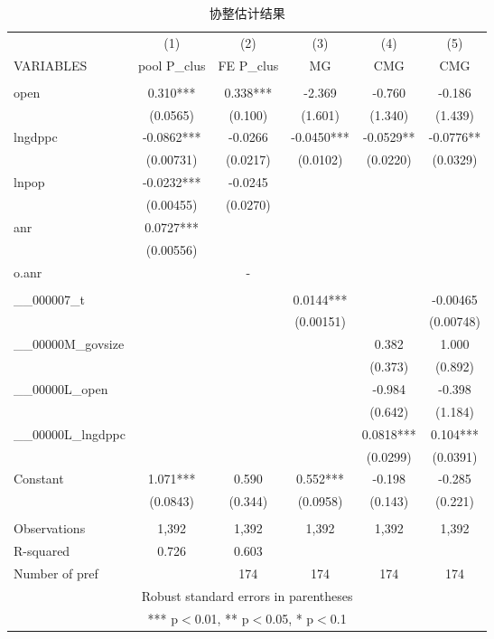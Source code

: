 \documentclass[10pt]{article}
\begin{document}
    \begin{table}
        \begin{center}
        \caption{协整估计结果} \label{tb:coint}
            \begin{tabular}{lccccc} \hline \hline
             & (1) & (2) & (3) & (4) & (5) \\
            VARIABLES & pool P\_clus & FE P\_clus & MG & CMG & CMG \\ \hline
             &  &  &  &  &  \\
            open & 0.310*** & 0.338*** & -2.369 & -0.760 & -0.186 \\
             & (0.0565) & (0.100) & (1.601) & (1.340) & (1.439) \\
            lngdppc & -0.0862*** & -0.0266 & -0.0450*** & -0.0529** & -0.0776** \\
             & (0.00731) & (0.0217) & (0.0102) & (0.0220) & (0.0329) \\
            lnpop & -0.0232*** & -0.0245 &  &  &  \\
             & (0.00455) & (0.0270) &  &  &  \\
            anr & 0.0727*** &  &  &  &  \\
             & (0.00556) &  &  &  &  \\
            o.anr &  & - &  &  &  \\
             &  &  &  &  &  \\
            \_\_000007\_t &  &  & 0.0144*** &  & -0.00465 \\
             &  &  & (0.00151) &  & (0.00748) \\
            \_\_00000M\_govsize &  &  &  & 0.382 & 1.000 \\
             &  &  &  & (0.373) & (0.892) \\
            \_\_00000L\_open &  &  &  & -0.984 & -0.398 \\
             &  &  &  & (0.642) & (1.184) \\
            \_\_00000L\_lngdppc &  &  &  & 0.0818*** & 0.104*** \\
             &  &  &  & (0.0299) & (0.0391) \\
            Constant & 1.071*** & 0.590 & 0.552*** & -0.198 & -0.285 \\
             & (0.0843) & (0.344) & (0.0958) & (0.143) & (0.221) \\
             &  &  &  &  &  \\
            Observations & 1,392 & 1,392 & 1,392 & 1,392 & 1,392 \\
            R-squared & 0.726 & 0.603 &  &  &  \\
             Number of pref &  & 174 & 174 & 174 & 174 \\ \hline \hline
            \multicolumn{6}{c}{ Robust standard errors in parentheses} \\
            \multicolumn{6}{c}{ *** p$<$0.01, ** p$<$0.05, * p$<$0.1} \\
        \end{tabular}
        \end{center}
    \end{table}
\end{document}
